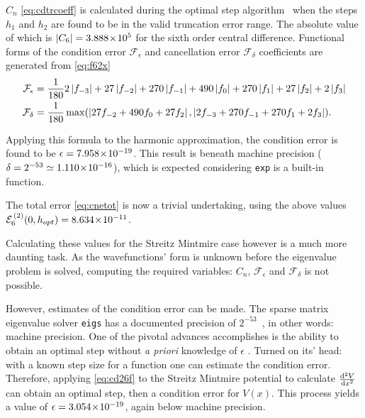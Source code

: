 $C_n$ \cref{eq:cdtrcoeff} is calculated during the optimal step algorithm~\cite{Mathur2012} when the steps $h_1$ and $h_2$ are found to be in the valid truncation error range.
The absolute value of which is $\left\lvert C_6\right\rvert = 3.888\!\times\!10^{5}$ for the sixth order central difference.
Functional forms of the condition error $\mathcal{F}_\epsilon$ and cancellation error $\mathcal{F}_\delta$ coefficients are generated from \cref{eq:f62x}
{\mathindent=0.4cm
\begin{align}
\mathcal{F}_\epsilon &= \frac{1}{180}2\left\lvert f_{-3}\right\rvert + 27\left\lvert f_{-2}\right\rvert + 270\left\lvert f_{-1}\right\rvert + 490\left\lvert f_{0}\right\rvert + 270\left\lvert f_{1}\right\rvert + 27\left\lvert f_{2}\right\rvert + 2\left\lvert f_{3}\right\rvert \\
\mathcal{F}_\delta &= \frac{1}{180}\max(\left\lvert 27f_{-2} + 490f_{0} + 27f_{2}\right\rvert,\left\lvert 2f_{-3} + 270f_{-1} + 270f_{1} + 2f_{3}\right\rvert).
\end{align}
}

Applying this formula to the harmonic approximation, the condition error is found to be $\epsilon = 7.958\!\times\!10^{-19}$.
This result is beneath machine precision ($\delta = 2^{-53} \simeq 1.110\!\times\!10^{-16}$), which is expected considering \texttt{exp} is a built-in function.

The total error \cref{eq:cnetot} is now a trivial undertaking, using the above values $\mathcal{E}_6^{\,(2)}(0,h_{opt}) = 8.634\!\times\!10^{-11}$.

Calculating these values for the Streitz Mintmire case however is a much more daunting task.
As the wavefunctions' form is unknown before the eigenvalue problem is solved, computing the required variables: $C_n$, $\mathcal{F}_\epsilon$ and $\mathcal{F}_\delta$ is not possible.

However, estimates of the condition error can be made.
The sparse matrix eigenvalue solver \texttt{eigs} has a documented precision of $2^{-53}$~\cite{Mathworks2014}, in other words: machine precision.
One of the pivotal advances \citeauthor{Mathur2012} accomplishes is the ability to obtain an optimal step without \emph{a priori} knowledge of $\epsilon$ \cite{Mathur2012}.
Turned on its' head: with a known step size for a function one can estimate the condition error.
Therefore, applying \cref{eq:cd26f} to the Streitz Mintmire potential to calculate $\cramped{\frac{\mathrm{d}^2V}{\mathrm{d}x^2}}$ can obtain an optimal step, then a condition error for $V(x)$. 
This process yields a value of $\epsilon = 3.054\!\times\!10^{-19}$, again below machine precision.

